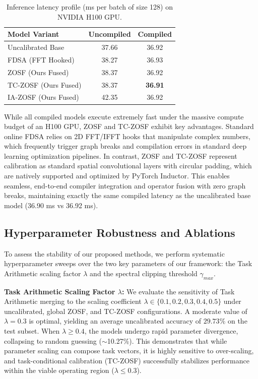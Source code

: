 \documentclass{article}
\theoremstyle{plain}
\theoremstyle{definition}
\theoremstyle{remark}
\begin{document}
\begin{table}[h]
\caption{Inference latency profile (ms per batch of size 128) on NVIDIA H100 GPU.}
\label{tab:latency}
\begin{center}
\begin{small}
\begin{sc}
\begin{tabular}{lcc}
\toprule
Model Variant & Uncompiled & Compiled \\
\midrule
Uncalibrated Base & 37.66 & 36.92 \\
FDSA (FFT Hooked) & 38.27 & 36.93 \\
ZOSF (Ours Fused) & 38.37 & 36.92 \\
TC-ZOSF (Ours Fused) & 38.37 & \textbf{36.91} \\
IA-ZOSF (Ours Fused) & 42.35 & 36.92 \\
\bottomrule
\end{tabular}
\end{sc}
\end{small}
\end{center}
\end{table}

While all compiled models execute extremely fast under the massive compute budget of an H100 GPU, ZOSF and TC-ZOSF exhibit key advantages. Standard online FDSA relies on 2D FFT/IFFT hooks that manipulate complex numbers, which frequently trigger graph breaks and compilation errors in standard deep learning optimization pipelines. In contrast, ZOSF and TC-ZOSF represent calibration as standard spatial convolutional layers with circular padding, which are natively supported and optimized by PyTorch Inductor. This enables seamless, end-to-end compiler integration and operator fusion with zero graph breaks, maintaining exactly the same compiled latency as the uncalibrated base model (36.90 ms vs 36.92 ms).

\subsection{Hyperparameter Robustness and Ablations}

To assess the stability of our proposed methods, we perform systematic hyperparameter sweeps over the two key parameters of our framework: the Task Arithmetic scaling factor $\lambda$ and the spectral clipping threshold $\gamma_{max}$.

\textbf{Task Arithmetic Scaling Factor $\lambda$:} We evaluate the sensitivity of Task Arithmetic merging to the scaling coefficient $\lambda \in \{0.1, 0.2, 0.3, 0.4, 0.5\}$ under uncalibrated, global ZOSF, and TC-ZOSF configurations. A moderate value of $\lambda = 0.3$ is optimal, yielding an average uncalibrated accuracy of $29.73\%$ on the test subset. When $\lambda \ge 0.4$, the models undergo rapid parameter divergence, collapsing to random guessing ($\sim$10.27\%). This demonstrates that while parameter scaling can compose task vectors, it is highly sensitive to over-scaling, and task-conditional calibration (TC-ZOSF) successfully stabilizes performance within the viable operating region ($\lambda \leq 0.3$).
\end{document}
